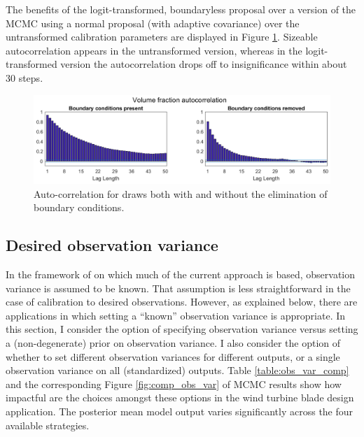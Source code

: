 \documentclass{article}
\begin{document}
The benefits of the logit-transformed, boundaryless proposal over a version of the MCMC using a normal proposal (with adaptive covariance) over the untransformed calibration parameters are displayed in Figure \ref{ACFs}. Sizeable autocorrelation appears in the untransformed version, whereas in the logit-transformed version the autocorrelation drops off to insignificance within about 30 steps.

\begin{figure}
\centering
\includegraphics[width=.9\linewidth]{ACF_bnd_cnds_fig}
\captionsetup{width=.9\linewidth}
\caption{Auto-correlation for draws both with and without the elimination of boundary conditions.}
\label{ACFs}
\end{figure}

\subsection{Desired observation variance}\label{des_obs_var}

In the framework of \cite{Kennedy2006} on which much of the current approach is based, observation variance is assumed to be known. That assumption is less straightforward in the case of calibration to desired observations. However, as explained below, there are applications in which setting a ``known'' observation variance is appropriate. In this section, I consider the option of specifying observation variance versus setting a (non-degenerate) prior on observation variance. I also consider the option of whether to set different observation variances for different outputs, or a single observation variance on all (standardized) outputs. Table \ref{table:obs_var_comp} and the corresponding Figure \ref{fig:comp_obs_var} of MCMC results show how impactful are the choices amongst these options in the wind turbine blade design application. The posterior mean model output varies significantly across the four available strategies.
\end{document}

